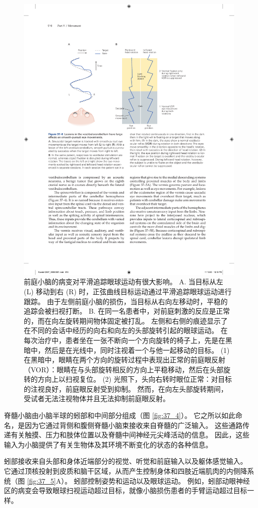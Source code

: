 \begin{figure}[htbp]
	\centering
	\includegraphics[width=0.8\linewidth]{chap37/fig_37_6}
	\caption{前庭小脑的病变对平滑追踪眼球运动有很大影响。 A. 当目标从左 (L) 移动到右 (R) 时，正弦曲线目标运动通过平滑追踪眼球运动进行跟踪。 由于左侧前庭小脑的损伤，当目标从右向左移动时，平稳的追踪会被扫视打断。 B. 在同一名患者中，对前庭刺激的反应是正常的，而在向左旋转期间物体固定被打乱。 左侧和右侧的痕迹显示了在不同的会话中经历的向右和向左的头部旋转引起的眼球运动。 在每次治疗中，患者坐在一张不断向一个方向旋转的椅子上，先是在黑暗中，然后是在光线中，同时注视着一个与他一起移动的目标。 (1) 在黑暗中，眼睛在两个方向的旋转过程中表现出正常的前庭眼反射（VOR）：眼睛在与头部旋转相反的方向上平稳移动，然后在头部旋转的方向上以扫视复位。 (2) 光照下，头向右转时眼位正常：对目标的注视良好，前庭眼反射受到抑制。 然而，在向左头部旋转期间，受试者无法注视物体并且无法抑制前庭眼反射。}
	\label{fig:37_6}
\end{figure}

脊髓小脑由小脑半球的蚓部和中间部分组成（图 \ref{fig:37_4}）。 它之所以如此命名，是因为它通过背侧和腹侧脊髓小脑束接收来自脊髓的广泛输入。 这些通路传递有关触摸、压力和肢体位置以及脊髓中间神经元尖峰活动的信息。 因此，这些输入为小脑提供了有关生物体及其环境不断变化的状态的各种信息。

蚓部接收来自头部和身体近端部分的视觉、听觉和前庭输入以及躯体感觉输入。 它通过顶核投射到皮质和脑干区域，从而产生控制身体和四肢近端肌肉的内侧降系统（图 \ref{fig:37_5}A）。 蚓部控制姿势和运动以及眼球运动。 例如，蚓部动眼神经区的病变会导致眼球扫视运动超过目标，就像小脑损伤患者的手臂运动超过目标一样。


